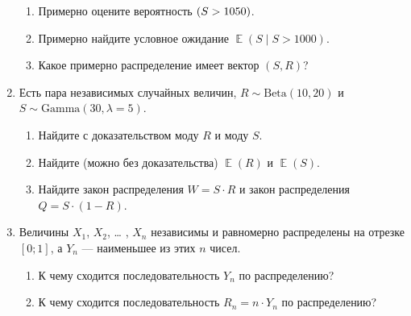 \documentclass[12pt]{article}
\let\P\relax
\DeclareMathOperator{\P}{\mathbb{P}}
\DeclareMathOperator{\E}{\mathbb{E}}
\newcommand{\dGamma}{\mathrm{Gamma}}
\newcommand{\dBeta}{\mathrm{Beta}}
\begin{document}
\begin{enumerate}
    \begin{enumerate}
        \item Примерно оцените вероятность $\P(S > 1050)$.
        \item Примерно найдите условное ожидание $\E(S \mid S > 1000)$.
        \item Какое примерно распределение имеет вектор $(S, R)$?
    \end{enumerate}

    \item Есть пара независимых случайных величин, $R \sim \dBeta(10, 20)$ и $S \sim \dGamma(30, \lambda = 5)$.
    \begin{enumerate}
        \item Найдите с доказательством моду $R$ и моду $S$. 
        \item Найдите (можно без доказательства) $\E(R)$ и $\E(S)$.
        \item Найдите закон распределения $W = S\cdot R$ и закон распределения $Q = S \cdot (1 - R)$.
    \end{enumerate}

    \item Величины $X_1$, $X_2$, \dots{ }, $X_n$ независимы и равномерно распределены на отрезке $[0;1]$,
    а $Y_n$ — наименьшее из этих $n$ чисел.
    \begin{enumerate}
        \item К чему сходится последовательность $Y_n$ по распределению?
        \item К чему сходится последовательность $R_n = n\cdot Y_n$ по распределению?
    \end{enumerate}


\end{enumerate}
\end{document}
